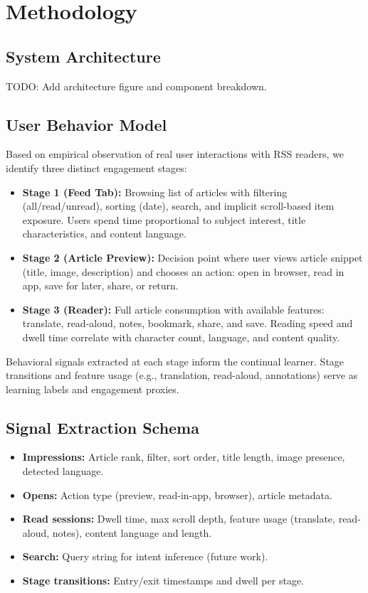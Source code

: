 \documentclass[11pt]{article}
\begin{document}
\section{Methodology}
\subsection{System Architecture}
TODO: Add architecture figure and component breakdown.

\subsection{User Behavior Model}
Based on empirical observation of real user interactions with RSS readers, we identify three distinct engagement stages:

\begin{itemize}[leftmargin=*]
\item \textbf{Stage 1 (Feed Tab):} Browsing list of articles with filtering (all/read/unread), sorting (date), search, and implicit scroll-based item exposure. Users spend time proportional to subject interest, title characteristics, and content language.
\item \textbf{Stage 2 (Article Preview):} Decision point where user views article snippet (title, image, description) and chooses an action: open in browser, read in app, save for later, share, or return.
\item \textbf{Stage 3 (Reader):} Full article consumption with available features: translate, read-aloud, notes, bookmark, share, and save. Reading speed and dwell time correlate with character count, language, and content quality.
\end{itemize}

Behavioral signals extracted at each stage inform the continual learner. Stage transitions and feature usage (e.g., translation, read-aloud, annotations) serve as learning labels and engagement proxies.

\subsection{Signal Extraction Schema}
\begin{itemize}[leftmargin=*]
\item \textbf{Impressions:} Article rank, filter, sort order, title length, image presence, detected language.
\item \textbf{Opens:} Action type (preview, read-in-app, browser), article metadata.
\item \textbf{Read sessions:} Dwell time, max scroll depth, feature usage (translate, read-aloud, notes), content language and length.
\item \textbf{Search:} Query string for intent inference (future work).
\item \textbf{Stage transitions:} Entry/exit timestamps and dwell per stage.
\end{itemize}
\end{document}
